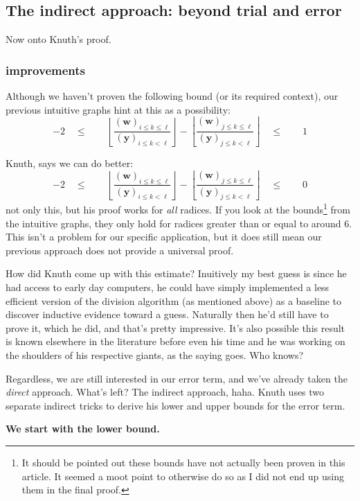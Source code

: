 \documentclass[twoside]{article}
\renewcommand{\leq}{\ensuremath{\quad\le\qquad}}
\newcommand{\numer}[3][w]{\ensuremath{(\bm{#1})_{#2\le k\le #3}}}
\newcommand{\denom}[3][y]{\ensuremath{(\bm{#1})_{#2\le k <  #3}}}
\begin{document}
\subsection*{The indirect approach: beyond trial and error}

Now onto Knuth's proof.

\subsubsection*{improvements}

Although we haven't proven the following bound (or its required context), our previous intuitive graphs hint at this as a possibility:
$$ -2\leq\left\lfloor\frac{\numer{i}{\ell}}{\denom{i}{\ell}}\right\rfloor
		-\left\lfloor\frac{\numer{j}{\ell}}{\denom{j}{\ell}}\right\rfloor\leq 1 $$

Knuth, says we can do better:
$$ -2\leq\left\lfloor\frac{\numer{i}{\ell}}{\denom{i}{\ell}}\right\rfloor
		-\left\lfloor\frac{\numer{j}{\ell}}{\denom{j}{\ell}}\right\rfloor\leq 0 $$
not only this, but his proof works for \emph{all} radices. If you look at the bounds\footnote{It should be pointed out these
bounds have not actually been proven in this article. It seemed a moot point to otherwise do so as I did not end up using them
in the final proof.} from the intuitive graphs, they only hold for radices greater than or equal to around $ 6 $. This isn't
a problem for our specific application, but it does still mean our previous approach does not provide a universal proof.

How did Knuth come up with this estimate? Inuitively my best guess is since he had access to early day computers, he could have simply
implemented a less efficient version of the division algorithm (as mentioned above) as a baseline to discover inductive evidence toward
a guess. Naturally then he'd still have to prove it, which he did, and that's pretty impressive. It's also possible this result is known
elsewhere in the literature before even his time and he was working on the shoulders of his respective giants, as the saying goes.
Who knows?

Regardless, we are still interested in our error term, and we've already taken the \emph{direct} approach. What's left?
The indirect approach, haha. Knuth uses two separate indirect tricks to derive his lower and upper bounds for the error term.

\newpage

{\bfseries We start with the lower bound.}
\end{document}
